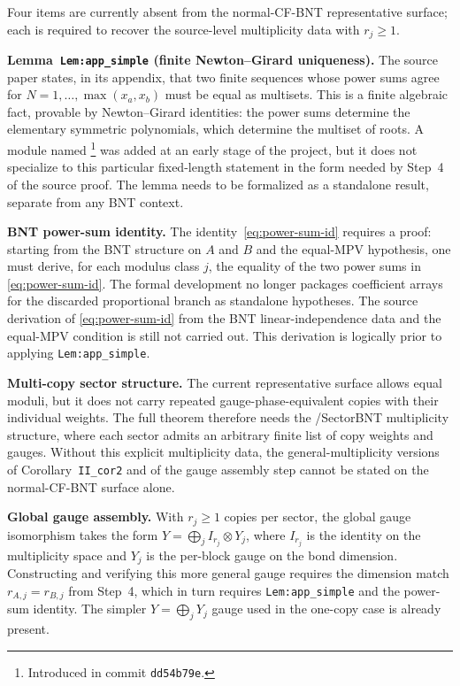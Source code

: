 \documentclass{article}
\begin{document}
Four items are currently absent from the normal-CF-BNT representative surface;
each is required to recover the source-level multiplicity data with
$r_j \ge 1$.

\textbf{Lemma~\texttt{Lem:app\_simple} (finite Newton--Girard uniqueness).}
The source paper states, in its appendix, that two finite sequences whose
power sums agree for $N = 1, \ldots, \max(x_a, x_b)$ must be equal as
multisets. This is a finite algebraic fact, provable by Newton--Girard
identities: the power sums determine the elementary symmetric polynomials,
which determine the multiset of roots. A module named
\footnote{Introduced in commit
    \texttt{dd54b79e}.} was added at an early stage of the project, but it does
not specialize to this particular fixed-length statement in the form needed by
Step~4 of the source proof. The lemma needs to be formalized as a standalone
result, separate from any BNT context.

\textbf{BNT power-sum identity.}
The identity~\eqref{eq:power-sum-id} requires a proof: starting from the
BNT structure on $A$ and $B$ and the equal-MPV hypothesis, one must derive,
for each modulus class $j$, the equality of the two power sums in
\eqref{eq:power-sum-id}. The formal development no longer packages
coefficient arrays for the discarded proportional branch as standalone
hypotheses. The source derivation of \eqref{eq:power-sum-id} from the BNT
linear-independence data and the equal-MPV condition is still not carried out.
This derivation is logically prior to applying \texttt{Lem:app\_simple}.

\textbf{Multi-copy sector structure.}
The current representative surface  allows
equal moduli, but it does not carry repeated gauge-phase-equivalent copies with
their individual weights. The full theorem therefore needs the
/SectorBNT multiplicity structure, where each
sector admits an arbitrary finite list of copy weights and gauges. Without
this explicit multiplicity data, the general-multiplicity versions of
Corollary~\texttt{II\_cor2} and of the gauge assembly step cannot be stated on
the normal-CF-BNT surface alone.

\textbf{Global gauge assembly.}
With $r_j \ge 1$ copies per sector, the global gauge isomorphism takes the
form $Y = \bigoplus_j I_{r_j} \otimes Y_j$, where $I_{r_j}$ is the identity
on the multiplicity space and $Y_j$ is the per-block gauge on the bond
dimension. Constructing and verifying this more general gauge requires the
dimension match $r_{A,j} = r_{B,j}$ from Step~4, which in turn requires
\texttt{Lem:app\_simple} and the power-sum identity. The simpler
$Y = \bigoplus_j Y_j$ gauge used in the one-copy case is already present.
\end{document}
